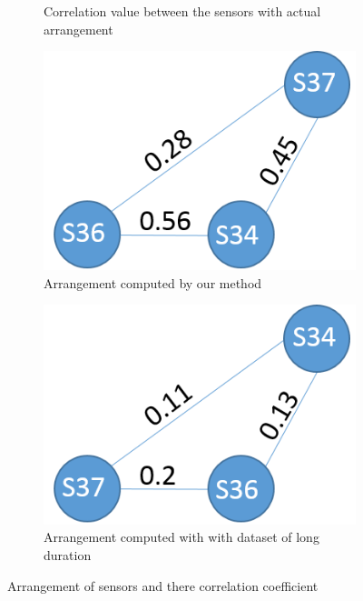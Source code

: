 \begin{figure}[!ht]
\begin{subfigure}[b]{0.4\textwidth}
\caption{Correlation value between the sensors with actual arrangement}
\label{fig:true_arr}
\qquad
\end{subfigure}
\begin{subfigure}[b]{0.4\textwidth}
\centering
\includegraphics[scale=0.5]{./pics/computer_arr.png}
\caption{Arrangement computed by our method}
\label{fig:false_arr}
\qquad
\end{subfigure}
\begin{subfigure}[b]{0.4\textwidth}
\centering
\includegraphics[scale=0.5]{./pics/long_data_arr.png}
\caption{Arrangement computed with with dataset of long duration}
\label{fig:arr}
\qquad
\end{subfigure}
\caption{Arrangement of sensors and there correlation coefficient}
\label{fig:arrangement}
\end{figure}
